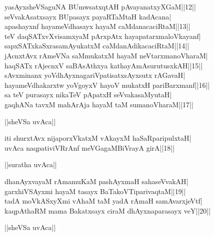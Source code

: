 \documentclass{article}
\begin{document}
yasAyxsheVSaguNA BUmwsatxqtAH pAvayanatxyXGaM||12||\\
seVvakAsatxsayx BUpasayx payaRTaMtaH kadAcana|\\
apashayxnf hayameVdhasayx hayaM caMdanacaciRtaM||13||\\
teV daqSATxvXvisamxyaM pArxpAtx hayapatarxmaloVkayanf|\\
sapxSATxkaSxrasamAyukatxM caMdanAdikacaciRtaM||14||\\
jAcnxtAvx rAmeVNa saMmukatxM hayaM neVtarxmanoVharaM|\\
haqSATx rAjecnxV saBAsAthxya kathayAmAsurutusxkAH||15||\\
sAvxminanx yoVdhAyxnagariVpatisatxsAyxsutx rAGavaH|\\
hayameVdhakarxtw yoVgoyxV hayoV mukatxH pariBarxmanf||16||\\
sa teV purasayx nikaTeV pApatxH seVvakasaMyutaH|\\
gaqhANa tavxM mahArAja hayaM taM sumanoVharaM||17||\\

\begin{center}
||sheVSa uvAca||
\end{center}

iti shurxtAvx nijaporxVkatxM vAkayxM haSaRparipulxtaH|\\
uvAca naqpativiVRrAnf meVGagaMBiVrayA girA||18||\\

\begin{center}
||suratha uvAca||
\end{center}

dhanAyxvayaM rAmamuKaM pashAyxmaH sahaseVvakAH|\\
garxhiVSAyxmi hayaM tasayx BaTakoVTiparivaqtaM||19||\\
tadA moVkASxyXmi vAhaM taM yadA rAmaH samAvarxjeVtf|\\
kaqpAthaRM mama Bakatxsayx ciraM dhAyxnaparasayx veY||20||\\

\begin{center}
||sheVSa uvAca||
\end{center}
\end{document}
